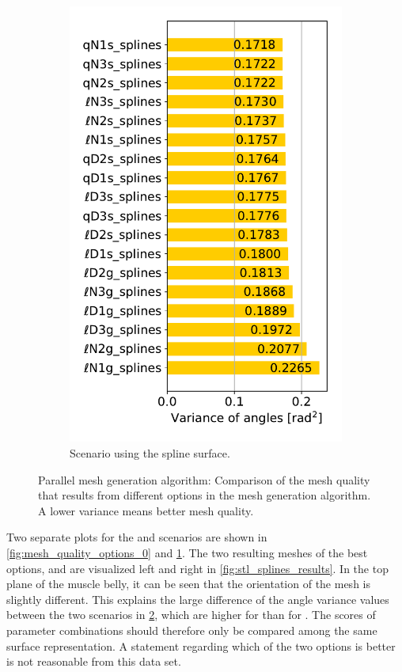 \begin{figure}
\begin{subfigure}[t]{0.48\textwidth}
    \includegraphics[width=\textwidth]{images/parallel_fiber_estimation/mesh_quality_options_1.pdf}%
    \caption{Scenario using the spline surface.}%
    \label{fig:mesh_quality_options_1}%
  \end{subfigure}
  \caption{Parallel mesh generation algorithm: Comparison of the mesh quality that results from different options in the mesh generation algorithm. A lower variance means better mesh quality.}%
  \label{fig:3mesh_quality}%
\end{figure}%

Two separate plots  for the  and  scenarios are shown in \cref{fig:mesh_quality_options_0} and \cref{fig:mesh_quality_options_1}.
The two resulting meshes of the best options,  and  are visualized left and right in \cref{fig:stl_splines_results}.
In the top plane of the muscle belly, it can be seen that the orientation of the mesh is slightly different. This explains the large difference of the angle variance values between the two scenarios in \cref{fig:3mesh_quality}, which are higher for  than for . The scores of parameter combinations should therefore only be compared among the same surface representation. A statement regarding which of the two options is better is not reasonable from this data set.

